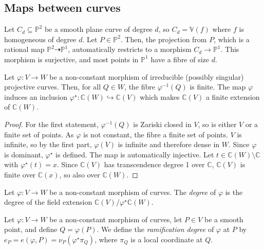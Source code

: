 \subsection{Maps between curves}
\begin{example}
    Let \( C_d \subseteq \mathbb P^2 \) be a smooth plane curve of degree \( d \), so \( C_d = \mathbb V(f) \) where \( f \) is homogeneous of degree \( d \).
    Let \( P \in \mathbb P^2 \).
    Then, the projection from \( P \), which is a rational map \( \mathbb P^2 \dashrightarrow \mathbb P^1 \), automatically restricts to a morphism \( C_d \to \mathbb P^1 \).
    This morphism is surjective, and most points in \( \mathbb P^1 \) have a fibre of size \( d \).
\end{example}
\begin{proposition}
    Let \( \varphi \colon V \to W \) be a non-constant morphism of irreducible (possibly singular) projective curves.
    Then, for all \( Q \in W \), the fibre \( \varphi^{-1}(Q) \) is finite.
    The map \( \varphi \) induces an inclusion \( \varphi^\star \colon \mathbb C(W) \hookrightarrow \mathbb C(V) \) which makes \( \mathbb C(V) \) a finite extension of \( \mathbb C(W) \).
\end{proposition}
\begin{proof}
    For the first statement, \( \varphi^{-1}(Q) \) is Zariski closed in \( V \), so is either \( V \) or a finite set of points.
    As \( \varphi \) is not constant, the fibre a finite set of points.
    \( V \) is infinite, so by the first part, \( \varphi(V) \) is infinite and therefore dense in \( W \).
    Since \( \varphi \) is dominant, \( \varphi^\star \) is defined.
    The map is automatically injective.
    Let \( t \in \mathbb C(W) \setminus \mathbb C \) with \( \varphi^\star(t) = x \).
    Since \( \mathbb C(V) \) has transcendence degree 1 over \( \mathbb C \), \( \mathbb C(V) \) is finite over \( \mathbb C(x) \), so also over \( \mathbb C(W) \).
\end{proof}
\begin{definition}
    Let \( \varphi \colon V \to W \) be a non-constant morphism of curves.
    The \emph{degree} of \( \varphi \) is the degree of the field extension \( \mathbb C(V)/\varphi^\star\mathbb C(W) \).
\end{definition}
\begin{definition}
    Let \( \varphi \colon V \to W \) be a non-constant morphism of curves, let \( P \in V \) be a smooth point, and define \( Q = \varphi(P) \).
    We define the \emph{ramification degree} of \( \varphi \) at \( P \) by \( e_P = e(\varphi, P) = \nu_P(\varphi^\star \pi_Q) \), where \( \pi_Q \) is a local coordinate at \( Q \).
\end{definition}
